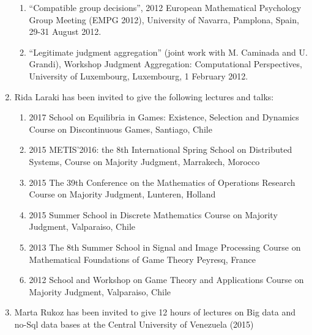 \documentclass[version=last, pagesize, twoside=semi, DIV=calc, 12pt, a4paper, french, english, bibliography=totoc]{scrartcl}
\begin{document}
\begin{enumerate}
\begin{enumerate}
\item  “Compatible group decisions”, 2012 European Mathematical Psychology Group Meeting (EMPG 2012), University of Navarra, Pamplona, Spain, 29-31 August 2012.
\item  “Legitimate judgment aggregation” (joint work with M. Caminada and U. Grandi), Workshop Judgment Aggregation: Computational Perspectives, University of Luxembourg, Luxembourg, 1 February 2012.
\end{enumerate}
\item Rida Laraki has been invited to give the following lectures and talks:
\begin{enumerate}
\item 2017 School on Equilibria in Games: Existence, Selection and Dynamics Course on Discontinuous Games, Santiago, Chile
\item 2015 METIS’2016: the 8th International Spring School on Distributed Systems, Course on Majority Judgment, Marrakech, Morocco
\item 2015 The 39th Conference on the Mathematics of Operations Research Course on Majority Judgment, Lunteren, Holland
\item 2015 Summer School in Discrete Mathematics Course on Majority Judgment, Valparaiso, Chile
\item 2013 The 8th Summer School in Signal and Image Processing Course on Mathematical Foundations of Game Theory Peyresq, France
\item 2012 School and Workshop on Game Theory and Applications Course on Majority Judgment, Valparaiso, Chile
\end{enumerate}
 \item Marta Rukoz has been invited to give 
12 hours of lectures on Big data and no-Sql data bases at the Central University of Venezuela  (2015)%


\end{enumerate}
\end{document}
